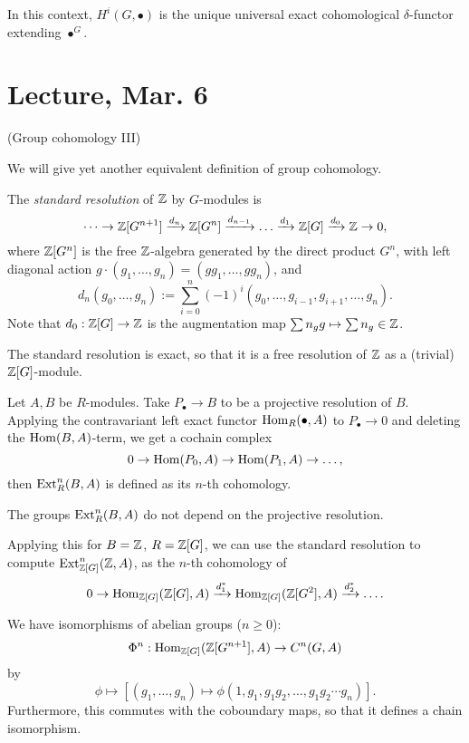 \documentclass[11pt]{amsart}
\begin{document}
In this context, $H^i(G,\bullet)$ is the unique universal exact cohomological $\delta$-functor extending $\bullet^G$.



\section{Lecture, Mar. 6}

(Group cohomology III)

We will give yet another equivalent definition of group cohomology.

\begin{defn}
    The \emph{standard resolution} of $\mathbb{Z}$ by $G$-modules is
    \[\dots\to \mathbb{Z}[G^{n+1}] \xrightarrow{d_n} \mathbb{Z}[G^n] \xrightarrow{d_{n-1}} \dots \xrightarrow{d_1} \mathbb{Z}[G] \xrightarrow{d_0} \mathbb{Z} \to 0,\]
    where $\mathbb{Z}[G^n]$ is the free $\mathbb{Z}$-algebra generated by the direct product $G^n$, with left diagonal action $g\cdot(g_1,\dots,g_n) = (gg_1,\dots,gg_n)$, and
    \[d_n(g_0,\dots,g_n) := \sum_{i=0}^n (-1)^i (g_0,\dots,g_{i-1},g_{i+1},\dots,g_n).\]
    Note that $d_0: \mathbb{Z}[G]\to \mathbb{Z}$ is the augmentation map $\sum n_g g \mapsto \sum n_g \in \mathbb{Z}$.
\end{defn}

\begin{lem}
    The standard resolution is exact, so that it is a free resolution of $\mathbb{Z}$ as a (trivial) $\mathbb{Z}[G]$-module.
\end{lem}


\begin{defn}
    Let $A,B$ be $R$-modules. Take $P_\bullet\to B$ to be a projective resolution of $B$. Applying the contravariant left exact functor $\operatorname{Hom}_R(\bullet, A)$ to $P_\bullet \to 0$ and deleting the $\operatorname{Hom}(B,A)$-term, we get a cochain complex
    \[0\to \operatorname{Hom}(P_0,A) \to \operatorname{Hom}(P_1,A) \to\dots,\]
    then $\operatorname{Ext}_R^n(B,A)$ is defined as its $n$-th cohomology.
\end{defn}

\begin{lem}
    The groups $\operatorname{Ext}_R^n(B,A)$ do not depend on the projective resolution.
\end{lem}

Applying this for $B = \mathbb{Z}$, $R=\mathbb{Z}[G]$, we can use the standard resolution to compute $\operatorname{Ext}_{\mathbb{Z}[G]}^n(\mathbb{Z}, A)$, as the $n$-th cohomology of
\[0\to \operatorname{Hom}_{\mathbb{Z}[G]}(\mathbb{Z}[G],A) \xrightarrow{d_1^\ast} \operatorname{Hom}_{\mathbb{Z}[G]}(\mathbb{Z}[G^2],A) \xrightarrow{d_2^\ast} \dots.\]

\begin{prop}
    We have isomorphisms of abelian groups ($n\ge 0$):
    \[\Phi^n: \operatorname{Hom}_{\mathbb{Z}[G]}(\mathbb{Z}[G^{n+1}], A) \to C^n(G,A)\]
    by
    \[\phi \mapsto [(g_1,\dots,g_n) \mapsto \phi(1, g_1, g_1g_2, \dots, g_1g_2\cdots g_n)].\]
    Furthermore, this commutes with the coboundary maps, so that it defines a chain isomorphism.
\end{prop}
\end{document}
